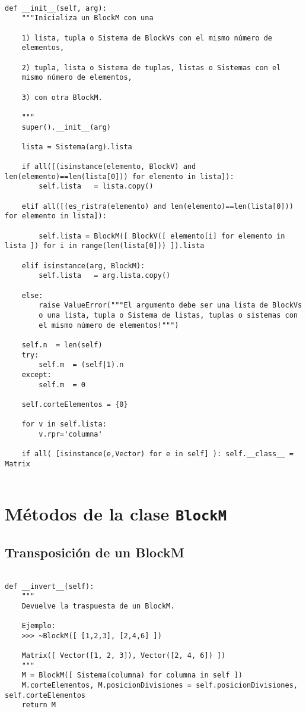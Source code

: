 \documentclass[11pt]{report}
\begin{document}
\begin{verbatim}

def __init__(self, arg):
    """Inicializa un BlockM con una

    1) lista, tupla o Sistema de BlockVs con el mismo número de
    elementos,
    
    2) tupla, lista o Sistema de tuplas, listas o Sistemas con el
    mismo número de elementos,
    
    3) con otra BlockM.

    """
    super().__init__(arg)
    
    lista = Sistema(arg).lista
    
    if all([(isinstance(elemento, BlockV) and len(elemento)==len(lista[0])) for elemento in lista]):
        self.lista   = lista.copy()

    elif all([(es_ristra(elemento) and len(elemento)==len(lista[0])) for elemento in lista]):

        self.lista = BlockM([ BlockV([ elemento[i] for elemento in lista ]) for i in range(len(lista[0])) ]).lista

    elif isinstance(arg, BlockM):
        self.lista   = arg.lista.copy()

    else: 
        raise ValueError("""El argumento debe ser una lista de BlockVs
        o una lista, tupla o Sistema de listas, tuplas o sistemas con
        el mismo número de elementos!""")
    
    self.n  = len(self)
    try: 
        self.m  = (self|1).n
    except:
        self.m  = 0
            
    self.corteElementos = {0}
   
    for v in self.lista:
        v.rpr='columna'
        
    if all( [isinstance(e,Vector) for e in self] ): self.__class__ = Matrix
    
\end{verbatim}

\section{Métodos de la clase \texttt{BlockM}}
\label{sec:orgba9236e}
\subsection{Transposición de un BlockM}
\label{sec:orgb1e0566}

\begin{verbatim}

def __invert__(self):
    """
    Devuelve la traspuesta de un BlockM.
    
    Ejemplo:
    >>> ~BlockM([ [1,2,3], [2,4,6] ])
    
    Matrix([ Vector([1, 2, 3]), Vector([2, 4, 6]) ])
    """
    M = BlockM([ Sistema(columna) for columna in self ])
    M.corteElementos, M.posicionDivisiones = self.posicionDivisiones, self.corteElementos
    return M

\end{verbatim}
\end{document}
